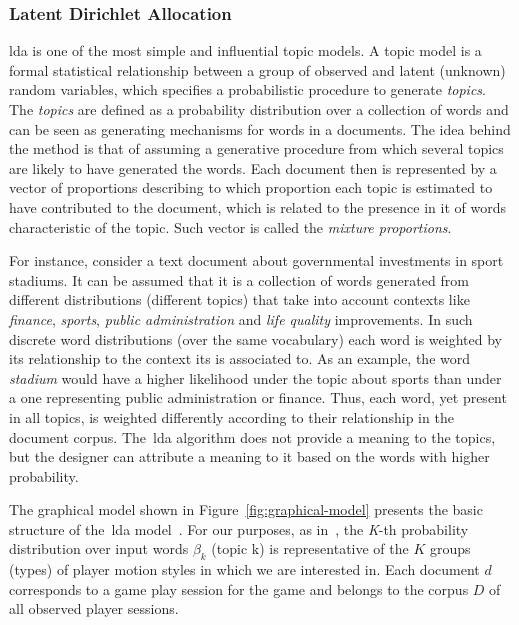 \subsubsection{Latent Dirichlet Allocation}
\glsdesc{lda} is one of the most simple and influential topic models. A topic model is a formal statistical relationship between a group of observed and latent (unknown) random variables, which specifies a probabilistic procedure to generate \textit{topics}. The \textit{topics} are defined as a probability distribution over a collection of words and can be seen as generating mechanisms for words in a documents. The idea behind the method is that of assuming a generative procedure from which several topics are likely to have generated the words. Each document then is represented by a vector of proportions describing to which proportion each topic is estimated to have contributed to the document, which is related to the presence in it of words characteristic of the topic. Such vector is called the \textit{mixture proportions}.



For instance, consider a text document about governmental investments in sport stadiums. It can be assumed that it is a collection of words generated from different distributions (different topics) that take into account contexts like \textit{finance}, \textit{sports}, \textit{public administration} and \textit{life quality} improvements. In such discrete word distributions (over the same vocabulary) each word is weighted by its relationship to the context its is associated to. As an example, the word \textit{stadium} would have a higher likelihood under the topic about sports than under a one representing public administration or finance. Thus, each word, yet present in all topics, is weighted differently according to their relationship in the document corpus. The~\glsdesc{lda} algorithm does not provide a meaning to the topics, but the designer can attribute a meaning to it based on the words with higher probability.

The graphical model shown in Figure~\ref{fig:graphical-model} presents the basic structure of the~\gls{lda} model~\citep{blei_latent_2003}. For our purposes, as in~\cite{smith_mining_2016}, the \textit{K}-th probability distribution over input words $\beta_{k}$ (topic k) is representative of the $K$ groups (types) of player motion styles in which we are interested in. Each document $d$ corresponds to a game play session for the game and belongs to the corpus $D$ of all observed player sessions.

